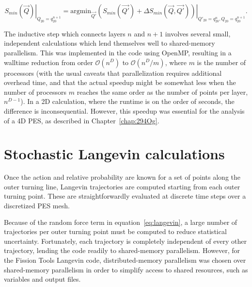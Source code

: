 \begin{equation}
\left.S_{min}(\vec{Q})\right|_{Q_{20}=q_{20}^{n+1}} = \mathrm{argmin}_{\vec{Q'}}\left.\left(S_{min}(\vec{Q'}) + \Delta S_{min}(\vec{Q},\vec{Q'})\right)\right|_{Q'_{20}=q_{20}^{n}, Q_{20}=q_{20}^{n+1}}.
\end{equation}

The inductive step which connects layers $n$ and $n+1$ involves several small, independent calculations which lend themselves well to shared-memory parallelism. This was implemented in the code using OpenMP, resulting in a walltime reduction from order $\mathcal{O}(n^D)$ to $\mathcal{O}(n^D/m)$, where $m$ is the number of processors (with the usual caveats that parallelization requires additional overhead time, and that the actual speedup might be somewhat less when the number of processors $m$ reaches the same order as the number of points per layer, $n^{D-1}$). In a 2D calculation, where the runtime is on the order of seconds, the difference is inconsequential. However, this speedup was essential for the analysis of a 4D PES, as described in Chapter~\ref{chap:294Og}.


\section{Stochastic Langevin calculations}
Once the action and relative probability are known for a set of points along the outer turning line, Langevin trajectories are computed starting from each outer turning point. These are straightforwardly evaluated at discrete time steps over a discretized PES mesh.

Because of the random force term in equation~\eqref{eq:langevin}, a large number of trajectories per outer turning point must be computed to reduce statistical uncertainty. Fortunately, each trajectory is completely independent of every other trajectory, lending the code readily to shared-memory parallelism. However, for the Fission Tools Langevin code, distributed-memory parallelism was chosen over shared-memory parallelism in order to simplify access to shared resources, such as variables and output files.